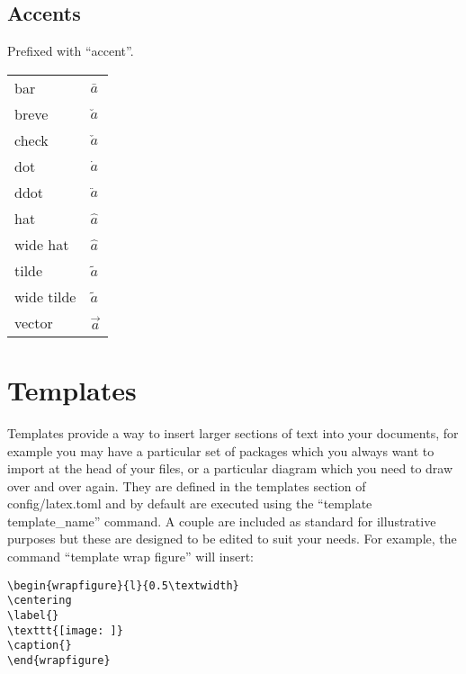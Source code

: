 \documentclass[12pt, a4paper]{article}
\begin{document}
\subsection{Accents}
Prefixed with ``accent''.

\begin{longtable}{ll}
bar & $\bar{a}$ \\
breve & $\breve{a}$ \\
check & $\check{a}$ \\
dot & $\dot{a}$ \\
ddot & $\ddot{a}$ \\
hat & $\hat{a}$ \\
wide hat & $\widehat{a}$ \\
tilde & $\tilde{a}$ \\
wide tilde & $\widetilde{a}$ \\
vector & $\vec{a}$ \\
\end{longtable}

\section{Templates}
Templates provide a way to insert larger sections of text into your documents, for example you may have a particular set of packages which you always want to import at the head of your files, or a particular diagram which you need to draw over and over again. They are defined in the templates section of config/latex.toml and by default are executed using the ``template template\_name'' command. A couple are included as standard for illustrative purposes but these are designed to be edited to suit your needs. For example, the command ``template wrap figure'' will insert:

\begin{verbatim}
\begin{wrapfigure}{l}{0.5\textwidth}
\centering
\label{}
\texttt{[image: ]}
\caption{}
\end{wrapfigure}
\end{verbatim}
\end{document}
